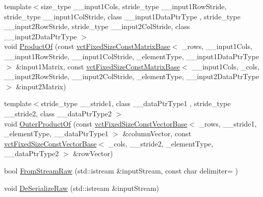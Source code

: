 \begin{DoxyCompactItemize}
\item 
{\footnotesize template$<$size\+\_\+type \+\_\+\+\_\+input1\+Cols, stride\+\_\+type \+\_\+\+\_\+input1\+Row\+Stride, stride\+\_\+type \+\_\+\+\_\+input1\+Col\+Stride, class \+\_\+\+\_\+input1\+Data\+Ptr\+Type , stride\+\_\+type \+\_\+\+\_\+input2\+Row\+Stride, stride\+\_\+type \+\_\+\+\_\+input2\+Col\+Stride, class \+\_\+\+\_\+input2\+Data\+Ptr\+Type $>$ }\\void \hyperlink{classvct_fixed_size_matrix_base_a1bbcba8e1551687b52b829189803601f}{Product\+Of} (const \hyperlink{classvct_fixed_size_const_matrix_base}{vct\+Fixed\+Size\+Const\+Matrix\+Base}$<$ \+\_\+rows, \+\_\+\+\_\+input1\+Cols, \+\_\+\+\_\+input1\+Row\+Stride, \+\_\+\+\_\+input1\+Col\+Stride, \+\_\+element\+Type, \+\_\+\+\_\+input1\+Data\+Ptr\+Type $>$ \&input1\+Matrix, const \hyperlink{classvct_fixed_size_const_matrix_base}{vct\+Fixed\+Size\+Const\+Matrix\+Base}$<$ \+\_\+\+\_\+input1\+Cols, \+\_\+cols, \+\_\+\+\_\+input2\+Row\+Stride, \+\_\+\+\_\+input2\+Col\+Stride, \+\_\+element\+Type, \+\_\+\+\_\+input2\+Data\+Ptr\+Type $>$ \&input2\+Matrix)
\item 
{\footnotesize template$<$stride\+\_\+type \+\_\+\+\_\+stride1, class \+\_\+\+\_\+data\+Ptr\+Type1 , stride\+\_\+type \+\_\+\+\_\+stride2, class \+\_\+\+\_\+data\+Ptr\+Type2 $>$ }\\void \hyperlink{classvct_fixed_size_matrix_base_afecb97a2b33c3de227df55cbe2508ad7}{Outer\+Product\+Of} (const \hyperlink{classvct_fixed_size_const_vector_base}{vct\+Fixed\+Size\+Const\+Vector\+Base}$<$ \+\_\+rows, \+\_\+\+\_\+stride1, \+\_\+element\+Type, \+\_\+\+\_\+data\+Ptr\+Type1 $>$ \&column\+Vector, const \hyperlink{classvct_fixed_size_const_vector_base}{vct\+Fixed\+Size\+Const\+Vector\+Base}$<$ \+\_\+cols, \+\_\+\+\_\+stride2, \+\_\+element\+Type, \+\_\+\+\_\+data\+Ptr\+Type2 $>$ \&row\+Vector)
\item 
bool \hyperlink{classvct_fixed_size_matrix_base_a39b44103dc07f56c33508303eed6aa11}{From\+Stream\+Raw} (std\+::istream \&input\+Stream, const char delimiter= \textquotesingle{} \textquotesingle{})
\item 
void \hyperlink{classvct_fixed_size_matrix_base_a0d00295ad8c1e71125f389767e342f98}{De\+Serialize\+Raw} (std\+::istream \&input\+Stream)
\end{DoxyCompactItemize}
